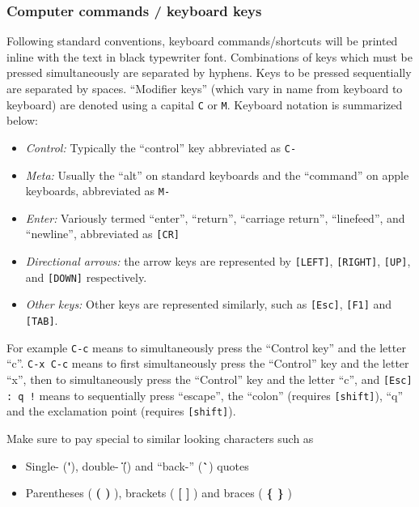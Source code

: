 \documentclass[10pt,letterpaper]{article}
\begin{document}
\subsubsection*{Computer commands / keyboard keys}

Following standard conventions, keyboard commands/shortcuts will be printed inline with the text in black typewriter font.  Combinations of keys which must be pressed simultaneously are separated by hyphens.  Keys to be pressed sequentially are separated by spaces.  ``Modifier keys'' (which vary in name from keyboard to keyboard) are denoted using a capital \texttt{C} or \texttt{M}.  Keyboard notation is summarized below:


\begin{itemize}
  \item \emph{Control:} Typically the ``control'' key abbreviated as \texttt{C-}
  \item \emph{Meta:} Usually the ``alt'' on standard keyboards and the ``command'' on apple keyboards, abbreviated as \texttt{M-}
  \item \emph{Enter:} Variously termed ``enter'', ``return'', ``carriage return'', ``linefeed'', and ``newline'', abbreviated as \texttt{[CR]}
  \item \emph{Directional arrows:} the arrow keys are represented by \texttt{[LEFT]}, \texttt{[RIGHT]}, \texttt{[UP]}, and \texttt{[DOWN]} respectively.
  \item \emph{Other keys:} Other keys are represented similarly, such as \texttt{[Esc]}, \texttt{[F1]} and \texttt{[TAB]}.
\end{itemize}


For example \texttt{C-c} means to simultaneously press the ``Control key'' and the letter ``c''.  \texttt{C-x C-c} means to first simultaneously press the ``Control'' key and the letter ``x'', then to simultaneously press the ``Control'' key and the letter ``c'', and \texttt{[Esc] : q !} means to sequentially press ``escape'', the ``colon'' (requires \texttt{[shift]}), ``q'' and the exclamation point (requires \texttt{[shift]}).


Make sure to pay special to similar looking characters such as
\begin{itemize}
  \item Single- (\textcolor{simpleRed}{\textbf{\'}}), double- (\textcolor{simpleRed}{\textbf{\"}}) and ``back-'' (\textcolor{simpleRed}{\textbf{\`}}) quotes
  \item Parentheses (\textcolor{simpleRed}{\textbf{ ( ) }}), brackets (\textcolor{simpleRed}{\textbf{ [ ] }}) and braces (\textcolor{simpleRed}{\textbf{ \{ \} }})
\end{itemize}
\end{document}
